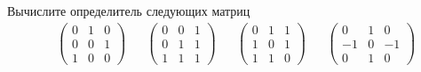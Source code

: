 \begin{exercise}
Вычислите определитель следующих матриц
\begin{align*}
	& \begin{pmatrix}
		0 & 1 & 0 \\ 0 & 0 & 1 \\ 1 & 0 & 0
	\end{pmatrix} &
	& \begin{pmatrix}
		0 & 0 & 1 \\ 0 & 1 & 1 \\ 1 & 1 & 1
	\end{pmatrix} &
	& \begin{pmatrix}
		0 & 1 & 1 \\ 1 & 0 & 1 \\ 1 & 1 & 0
	\end{pmatrix} &
	& \begin{pmatrix}
		0 & 1 & 0 \\ -1 & 0 & -1 \\ 0 & 1 & 0
	\end{pmatrix}
\end{align*}
\end{exercise}